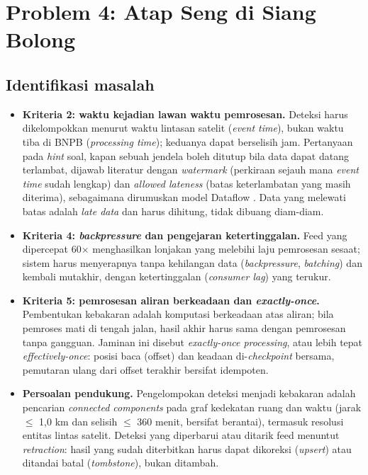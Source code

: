 \documentclass{fairmeta}
\newcommand{\en}[1]{\textit{#1}}
\begin{document}
\section{Problem 4: Atap Seng di Siang Bolong}
\label{sec:p4}

\subsection{Identifikasi masalah}

\begin{itemize}
  \item \textbf{Kriteria 2: waktu kejadian lawan waktu pemrosesan.} Deteksi harus dikelompokkan menurut waktu lintasan satelit (\en{event time}), bukan waktu tiba di BNPB (\en{processing time}); keduanya dapat berselisih jam. Pertanyaan pada \en{hint} soal, kapan sebuah jendela boleh ditutup bila data dapat datang terlambat, dijawab literatur dengan \en{watermark} (perkiraan sejauh mana \en{event time} sudah lengkap) dan \en{allowed lateness} (batas keterlambatan yang masih diterima), sebagaimana dirumuskan model Dataflow \citep{dataflow}. Data yang melewati batas adalah \en{late data} dan harus dihitung, tidak dibuang diam-diam.
  \item \textbf{Kriteria 4: \en{backpressure} dan pengejaran ketertinggalan.} Feed yang dipercepat 60$\times$ menghasilkan lonjakan yang melebihi laju pemrosesan sesaat; sistem harus menyerapnya tanpa kehilangan data (\en{backpressure}, \en{batching}) dan kembali mutakhir, dengan ketertinggalan (\en{consumer lag}) yang terukur.
  \item \textbf{Kriteria 5: pemrosesan aliran berkeadaan dan \en{exactly-once}.} Pembentukan kebakaran adalah komputasi berkeadaan atas aliran; bila pemroses mati di tengah jalan, hasil akhir harus sama dengan pemrosesan tanpa gangguan. Jaminan ini disebut \en{exactly-once processing}, atau lebih tepat \en{effectively-once}: posisi baca (offset) dan keadaan di-\en{checkpoint} bersama, pemutaran ulang dari offset terakhir bersifat idempoten.
  \item \textbf{Persoalan pendukung.} Pengelompokan deteksi menjadi kebakaran adalah pencarian \en{connected components} pada graf kedekatan ruang dan waktu (jarak $\leq$ 1,0 km dan selisih $\leq$ 360 menit, bersifat berantai), termasuk resolusi entitas lintas satelit. Deteksi yang diperbarui atau ditarik feed menuntut \en{retraction}: hasil yang sudah diterbitkan harus dapat dikoreksi (\en{upsert}) atau ditandai batal (\en{tombstone}), bukan ditambah.
\end{itemize}
\end{document}
